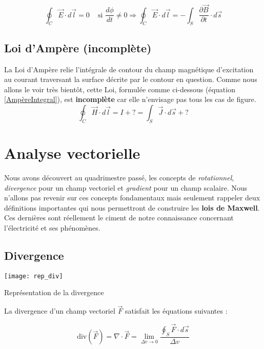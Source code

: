 \begin{equation}
 \oint_{C} \vec{E} \cdot d\vec{l} = 0 \hspace{10pt} \mbox{ si } \frac{d\phi}{dt} \not = 0 \Rightarrow  \oint_{C} \vec{E} \cdot d\vec{l} = -\int_{S} \frac{\partial \vec{B}}{\partial t} \cdot d\vec{s}
 \label{PotentielIntegral}
\end{equation}

\subsection{Loi d'Ampère (incomplète)}

La Loi d'Ampère relie l'intégrale de contour du champ magnétique d'excitation au courant traversant la surface décrite par le contour en question. 
Comme nous allons le voir très bientôt, cette Loi, formulée comme ci-dessous (équation \ref{AmpèreIntegral}), est \textbf{incomplète} car elle n'envisage pas tous les cas de figure.
\begin{equation}
 \oint_{C} \vec{H} \cdot d\vec{l} = I + ? = \int_{S} \vec{J} \cdot d\vec{s} + ? 
 \label{AmpèreIntegral}
\end{equation}

\section{Analyse vectorielle}

Nous avons découvert au quadrimestre passé, les concepts de \textit{rotationnel}, \textit{divergence} pour un champ vectoriel et \textit{gradient} pour un champ scalaire.
Nous n'allons pas revenir sur ces concepts fondamentaux mais seulement rappeler deux définitions importantes qui nous permettront de construire les \textbf{lois de Maxwell}. 
Ces dernières sont réellement le ciment de notre connaissance concernant l'électricité et ses phénomènes.

\subsection{Divergence} 
\begin{marginfigure}[0cm]
	\texttt{[image: rep\_div]}
	\caption{Représentation de la divergence}
\end{marginfigure}

La divergence d'un champ vectoriel $\vec{F}$ satisfait les équations suivantes : 

\[ \text{div}(\vec{F}) = \nabla \cdot \vec{F} = \lim_{\Delta v \to 0} \frac{\oint_{S} \vec{F} \cdot d\vec{s}}{\Delta v} \]

